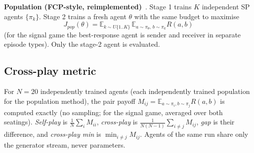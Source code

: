 \textbf{Population (FCP-style, reimplemented)}~\cite{strouse2021collaborating}. Stage 1 trains $K$ independent SP agents $\{\pi_k\}$. Stage 2 trains a fresh agent $\theta$ with the same budget to maximise
\begin{equation}J_{pop}(\theta)=\mathbb E_{k\sim U\{1..K\}}\,\mathbb E_{a\sim\pi_\theta,\,b\sim\pi_k}R(a,b)\end{equation}
(for the signal game the best-response agent is sender and receiver in separate episode types). Only the stage-2 agent is evaluated.

\subsection{Cross-play metric}
For $N=20$ independently trained agents (each independently trained population for the population method), the pair payoff $M_{ij}=\mathbb E_{a\sim\pi_i,b\sim\pi_j}R(a,b)$ is computed exactly (no sampling; for the signal game, averaged over both seatings). \emph{Self-play} is $\frac1N\sum_i M_{ii}$, \emph{cross-play} is $\frac1{N(N-1)}\sum_{i\ne j}M_{ij}$, \emph{gap} is their difference, and \emph{cross-play min} is $\min_{i\neq j}M_{ij}$. Agents of the same run share only the generator stream, never parameters.
